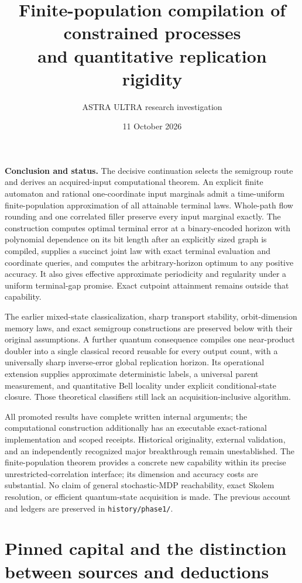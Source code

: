\documentclass[11pt]{article}
\title{Finite-population compilation of constrained processes\\and quantitative replication rigidity}
\author{ASTRA ULTRA research investigation}
\date{11 October 2026}
\begin{document}
\maketitle

\noindent\textbf{Conclusion and status.}
The decisive continuation selects the semigroup route and derives an acquired-input computational theorem. An explicit finite automaton and rational one-coordinate input marginals admit a time-uniform finite-population approximation of all attainable terminal laws. Whole-path flow rounding and one correlated filler preserve every input marginal exactly. The construction computes optimal terminal error at a binary-encoded horizon with polynomial dependence on its bit length after an explicitly sized graph is compiled, supplies a succinct joint law with exact terminal evaluation and coordinate queries, and computes the arbitrary-horizon optimum to any positive accuracy. It also gives effective approximate periodicity and regularity under a uniform terminal-gap promise. Exact cutpoint attainment remains outside that capability.

The earlier mixed-state classicalization, sharp transport stability, orbit-dimension memory laws, and exact semigroup constructions are preserved below with their original assumptions. A further quantum consequence compiles one near-product doubler into a single classical record reusable for every output count, with a universally sharp inverse-error global replication horizon. Its operational extension supplies approximate deterministic labels, a universal parent measurement, and quantitative Bell locality under explicit conditional-state closure. Those theoretical classifiers still lack an acquisition-inclusive algorithm.

All promoted results have complete written internal arguments; the computational construction additionally has an executable exact-rational implementation and scoped receipts. Historical originality, external validation, and an independently recognized major breakthrough remain unestablished. The finite-population theorem provides a concrete new capability within its precise unrestricted-correlation interface; its dimension and accuracy costs are substantial. No claim of general stochastic-MDP reachability, exact Skolem resolution, or efficient quantum-state acquisition is made. The previous account and ledgers are preserved in \texttt{history/phase1/}.

\tableofcontents

\section{Pinned capital and the distinction between sources and deductions}
\end{document}
